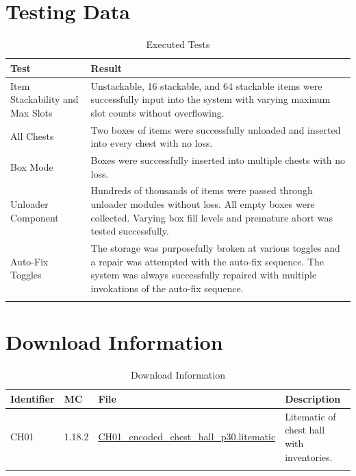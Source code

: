 \documentclass[10pt]{datasheet}
\begin{document}
\section{Testing Data}

\begin{table}[h]
\caption{Executed Tests}
\begin{tabularx}{\textwidth}{l | X}
    \thickhline
    \textbf{Test} & \textbf{Result} \\
    \hline
    Item Stackability and Max Slots & Unstackable, 16 stackable, and 64 stackable items were successfully input into the system with varying maxinum slot counts without overflowing.\\
    \hline
    All Chests & Two boxes of items were successfully unloaded and inserted into every chest with no loss.\\
    \hline
    Box Mode & Boxes were successfully inserted into multiple chests with no loss.\\
    \hline
    Unloader Component & Hundreds of thousands of items were passed through unloader modules without loss. All empty boxes were collected. Varying box fill levels and premature abort was tested successfully.\\
    \hline
    Auto-Fix Toggles & The storage was purposefully broken at various toggles and a repair was attempted with the auto-fix sequence. The system was always successfully repaired with multiple invokations of the auto-fix sequence.\\
    \thickhline
\end{tabularx}
\end{table}

\section{Download Information}
\begin{table}[h]
    \caption{Download Information}
    \begin{tabularx}{\textwidth}{l | l | l | X}
        \thickhline
        \textbf{Identifier} & \textbf{MC} & \textbf{File} & \textbf{Description} \\
        \hline
        CH01 & 1.18.2 & \href{https://github.com/Soontech-Annals/Archive/blob/8413f90a054b6c415703bae02badeba7541344f6/Archive/chest-halls/CH01\%20Parallelized\%20Encoded\%20Chest\%20Hall/CH01\_encoded\_chest\_hall\_p30.litematic?raw=1}{CH01\_encoded\_chest\_hall\_p30.litematic} & Litematic of chest hall with inventories. \\
        \thickhline
    \end{tabularx}
\end{table}
\end{document}
